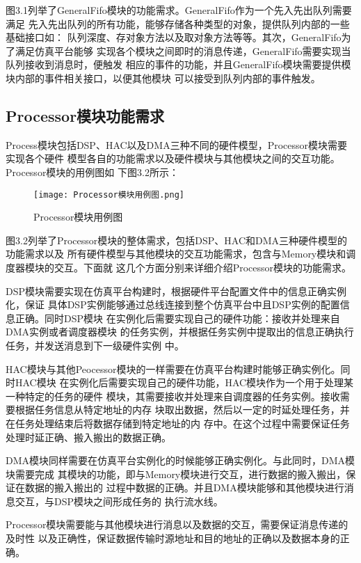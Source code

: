 图3.1列举了GeneralFifo模块的功能需求。GeneralFifo作为一个先入先出队列需要满足
先入先出队列的所有功能，能够存储各种类型的对象，提供队列内部的一些基础接口如：
队列深度、存对象方法以及取对象方法等等。其次，GeneralFifo为了满足仿真平台能够
实现各个模块之间即时的消息传递，GeneralFifo需要实现当队列接收到消息时，便触发
相应的事件的功能，并且GeneralFifo模块需要提供模块内部的事件相关接口，以便其他模块
可以接受到队列内部的事件触发。

\subsection{Processor模块功能需求}
Process模块包括DSP、HAC以及DMA三种不同的硬件模型，Processor模块需要实现各个硬件
模型各自的功能需求以及硬件模块与其他模块之间的交互功能。Processor模块的用例图如
下图3.2所示：

\begin{figure}[h]
    \centering
    \texttt{[image: Processor模块用例图.png]}
    \caption{Processor模块用例图}
    \label{fig:badge}
\end{figure}

图3.2列举了Processor模块的整体需求，包括DSP、HAC和DMA三种硬件模型的功能需求以及
所有硬件模型与其他模块的交互功能需求，包含与Memory模块和调度器模块的交互。下面就
这几个方面分别来详细介绍Processor模块的功能需求。

DSP模块需要实现在仿真平台构建时，根据硬件平台配置文件中的信息正确实例化，保证
具体DSP实例能够通过总线连接到整个仿真平台中且DSP实例的配置信息正确。同时DSP模块
在实例化后需要实现自己的硬件功能：接收并处理来自DMA实例或者调度器模块
的任务实例，并根据任务实例中提取出的信息正确执行任务，并发送消息到下一级硬件实例
中。

HAC模块与其他Peocessor模块的一样需要在仿真平台构建时能够正确实例化。同时HAC模块
在实例化后需要实现自己的硬件功能，HAC模块作为一个用于处理某一种特定的任务的硬件
模块，其需要接收并处理来自调度器的任务实例。接收需要根据任务信息从特定地址的内存
块取出数据，然后以一定的时延处理任务，并在任务处理结束后将数据存储到特定地址的内
存中。在这个过程中需要保证任务处理时延正确、搬入搬出的数据正确。

DMA模块同样需要在仿真平台实例化的时候能够正确实例化。与此同时，DMA模块需要完成
其模块的功能，即与Memory模块进行交互，进行数据的搬入搬出，保证在数据的搬入搬出的
过程中数据的正确。并且DMA模块能够和其他模块进行消息交互，与DSP模块之间形成任务的
执行流水线。

Processor模块需要能与其他模块进行消息以及数据的交互，需要保证消息传递的及时性
以及正确性，保证数据传输时源地址和目的地址的正确以及数据本身的正确。

